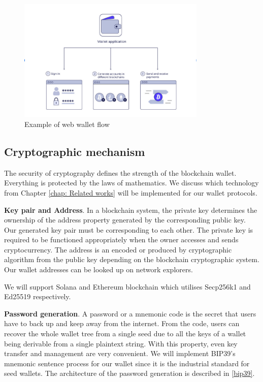 \begin{figure}[!ht]
    \centering
    \includegraphics[width=0.8\textwidth]{images/webwallet.png}
    \caption[Example of web wallet flow]{Example of web wallet flow}
    \label{fig:webwallet}
\end{figure}

\subsection{Cryptographic mechanism}
The security of cryptography defines the strength of the blockchain wallet. Everything is protected by the laws of mathematics. We discuss which technology from Chapter \ref{chap: Related works} will be implemented for our wallet protocols.

\bigskip
{\textbf{Key pair and Address}}. In a blockchain system, the private key determines the ownership of the address property generated by the corresponding public key. Our generated key pair must be corresponding to each other. The private key is required to be functioned appropriately when the owner accesses and sends cryptocurrency. The address is an encoded or produced by cryptographic algorithm from the public key depending on the blockchain cryptographic system. Our wallet addresses can be looked up on network explorers.

We will support Solana and Ethereum blockchain which utilises Secp256k1 and Ed25519 respectively.

\bigskip
{\textbf{Password generation}}. A password or a mnemonic code is the secret that users have to back up and keep away from the internet. From the code, users can recover the whole wallet tree from a single seed due to all the keys of a wallet being derivable from a single plaintext string. With this property, even key transfer and management are very convenient. We will implement BIP39's mnemonic sentence process for our wallet since it is the industrial standard for seed wallets.
The architecture of the password generation is described in \autoref{bip39}.

